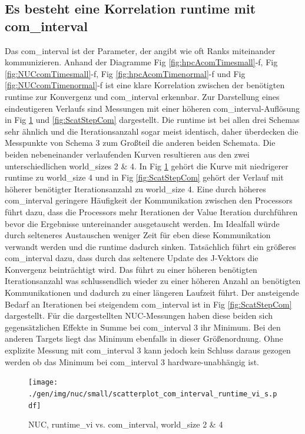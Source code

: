 \subsection{Es besteht eine Korrelation runtime mit com\_interval}

Das com\_interval ist der Parameter, der angibt wie oft Ranks miteinander kommunizieren.
Anhand der Diagramme Fig \ref{fig:hpcAcomTimesmall}-f, Fig \ref{fig:NUCcomTimesmall}-f, Fig \ref{fig:hpcAcomTimenormal}-f
und Fig \ref{fig:NUCcomTimenormal}-f
ist eine klare Korrelation zwischen der benötigten runtime zur Konvergenz und com\_interval erkennbar. Zur Darstellung eines
eindeutigeren Verlaufs sind Messungen mit einer höheren com\_interval-Auflösung in Fig \ref{fig:ScatRunCom} und \ref{fig:ScatStepCom}
dargestellt. Die runtime ist bei allen drei Schemas sehr ähnlich und die Iterationsanzahl sogar meist identisch,
daher überdecken die Messpunkte von Schema 3 zum Großteil die anderen beiden Schemata. Die beiden nebeneinander verlaufenden Kurven resultieren
aus den zwei unterschiedlichen world\_sizes 2 \& 4. In Fig \ref{fig:ScatRunCom} gehört die Kurve mit niedrigerer runtime zu world\_size 4 und
in Fig \ref{fig:ScatStepCom} gehört der Verlauf mit höherer benötigter Iterationsanzahl zu world\_size 4.
Eine durch höheres com\_interval geringere Häufigkeit der Kommunikation zwischen den Processors führt dazu, dass die Processors
mehr Iterationen der Value Iteration durchführen bevor die Ergebnisse untereinander ausgetauscht werden.
Im Idealfall würde durch selteneres Austauschen weniger Zeit für eben diese Kommunikation verwandt werden und die runtime dadurch sinken.
Tatsächlich führt ein größeres com\_interval dazu, dass durch das seltenere
Update des J-Vektors die Konvergenz beinträchtigt wird. Das führt zu einer höheren benötigten Iterationsanzahl was schlussendlich
wieder zu einer höheren Anzahl an benötigten Kommunikationen und dadurch
zu einer längeren Laufzeit führt. Der ansteigende Bedarf an Iterationen bei steigendem com\_interval ist in Fig \ref{fig:ScatStepCom}
dargestellt.
Für die dargestellten NUC-Messungen haben diese beiden sich gegensätzlichen Effekte in Summe bei com\_interval 3 ihr Minimum.
Bei den anderen Targets liegt das Minimum ebenfalls in dieser Größenordnung. Ohne explizite Messung mit com\_interval 3 kann jedoch
kein Schluss daraus gezogen werden ob das Minimum bei com\_interval 3 hardware-unabhängig ist.

\begin{figure}[h]
\texttt{[image: ./gen/img/nuc/small/scatterplot\_com\_interval\_runtime\_vi\_s.pdf]}
\vspace*{-8mm}
\caption{NUC, runtime\_vi vs. com\_interval, world\_size 2 \& 4}
\label{fig:ScatRunCom}
\end{figure}

